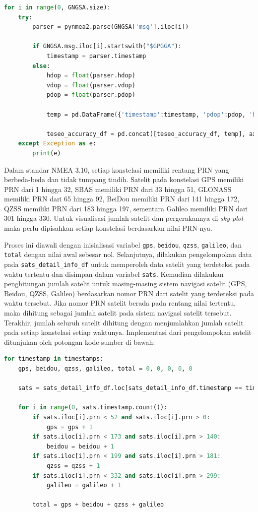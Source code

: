\begin{lstlisting}[language=python]
for i in range(0, GNGSA.size):
	try:
		parser = pynmea2.parse(GNGSA['msg'].iloc[i])
		
		if GNGSA.msg.iloc[i].startswith("$GPGGA"):
			timestamp = parser.timestamp
		else:
			hdop = float(parser.hdop)
			vdop = float(parser.vdop)
			pdop = float(parser.pdop)
			
			temp = pd.DataFrame({'timestamp':timestamp, 'pdop':pdop, 'hdop':hdop, 'vdop':vdop}, index=[i])
			
			teseo_accuracy_df = pd.concat([teseo_accuracy_df, temp], axis=0)
	except Exception as e:
		print(e)
\end{lstlisting}
	
Dalam standar NMEA 3.10, setiap konstelasi memiliki rentang PRN yang berbeda-beda dan tidak tumpang tindih. Satelit pada konstelasi GPS memiliki PRN dari 1 hingga 32, SBAS memiliki PRN dari 33 hingga 51, GLONASS memiliki PRN dari 65 hingga 92, BeiDou memiliki PRN dari 141 hingga 172, QZSS memiliki PRN dari 183 hingga 197, sementara Galileo memiliki PRN dari 301 hingga 330. Untuk visualisasi jumlah satelit dan pergerakannya di \textit{sky plot} maka perlu dipisahkan setiap konstelasi berdasarkan nilai PRN-nya.

Proses ini diawali dengan inisialisasi variabel \texttt{gps}, \texttt{beidou}, \texttt{qzss}, \texttt{galileo}, dan \texttt{total} dengan nilai awal sebesar nol. Selanjutnya, dilakukan pengelompokan data pada \texttt{sats\_detail\_info\_df} untuk memperoleh data satelit yang terdeteksi pada waktu tertentu dan disimpan dalam variabel \texttt{sats}. Kemudian dilakukan penghitungan jumlah satelit untuk masing-masing sistem navigasi satelit (GPS, Beidou, QZSS, Galileo) berdasarkan nomor PRN dari satelit yang terdeteksi pada waktu tersebut. Jika nomor PRN satelit berada pada rentang nilai tertentu, maka dihitung sebagai jumlah satelit pada sistem navigasi satelit tersebut. Terakhir, jumlah seluruh satelit dihitung dengan menjumlahkan jumlah satelit pada setiap konstelasi setiap waktunya. Implementasi dari pengelompokan satelit ditunjukan oleh potongan kode sumber di bawah:

\begin{lstlisting}[language=python]
for timestamp in timestamps:
	gps, beidou, qzss, galileo, total = 0, 0, 0, 0, 0
	
	sats = sats_detail_info_df.loc[sats_detail_info_df.timestamp == timestamp]
	
	for i in range(0, sats.timestamp.count()):
		if sats.iloc[i].prn < 52 and sats.iloc[i].prn > 0:
			gps = gps + 1
		if sats.iloc[i].prn < 173 and sats.iloc[i].prn > 140:
			beidou = beidou + 1
		if sats.iloc[i].prn < 199 and sats.iloc[i].prn > 181:
			qzss = qzss + 1
		if sats.iloc[i].prn < 332 and sats.iloc[i].prn > 299:
			galileo = galileo + 1 
		
		total = gps + beidou + qzss + galileo
\end{lstlisting}

